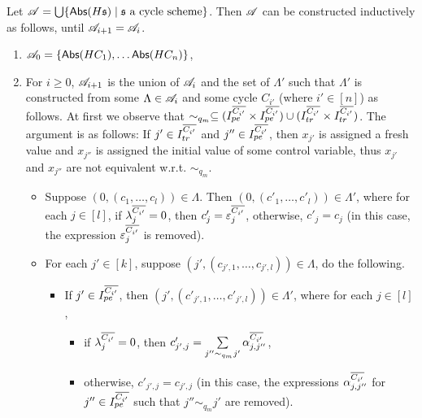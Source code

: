 Let $\mathscr{A}=\bigcup \{\mathsf{Abs}(H{\mathfrak{s} }) \mid {\mathfrak{s} } \mbox{ a cycle scheme}\}$. Then $\mathscr{A}$ can be constructed inductively as follows, until $\mathscr{A}_{i+1}= \mathscr{A}_i$. 
\begin{enumerate}
\item $\mathscr{A}_0 = \{\mathsf{Abs}(HC_1), \ldots \mathsf{Abs}(HC_n)\}$,

\item For $i \ge 0$, $\mathscr{A}_{i+1}$ is the union of $\mathscr{A}_i$ and the set of $\Lambda'$ such that $\Lambda'$ is constructed from some $\Lambda \in \mathscr{A}_i$ and some cycle $C_{i'}$ (where $ i' \in [n]$) as follows. At first we observe that $\sim_{q_m} \subseteq (I^{\overline{C_{i'}}}_{pe} \times I^{\overline{C_{i'}}}_{pe}) \cup (I^{\overline{C_{i'}}}_{tr} \times I^{\overline{C_{i'}}}_{tr})$. The argument is as follows: If $j' \in I^{\overline{C_{i'}}}_{tr}$ and $j'' \in I^{\overline{C_{i'}}}_{pe}$, then $x_{j'}$ is assigned a fresh value and $x_{j''}$ is assigned the initial value of some control variable, thus $x_{j'}$ and $x_{j''}$ are not equivalent w.r.t. $\sim_{q_m}$.
%
\begin{itemize}
\item Suppose $(0, (c_1, \dots, c_l)) \in \Lambda$. Then $(0, (c'_1, \dots, c'_l)) \in \Lambda'$, where for each $j \in [l]$, if $\lambda^{\overline{C_{i'}}}_j = 0$, then $c'_j = \varepsilon^{\overline{C_{i'}}}_{j}$, otherwise, $c'_j = c_j$ (in this case, the expression $\varepsilon^{\overline{C_{i'}}}_{j}$ is removed).  
%
\item For each $j' \in [k]$, suppose $(j', (c_{j',1}, \dots, c_{j',l})) \in \Lambda$, do the following. 
\begin{itemize}
\item If $j' \in I^{\overline{C_{i'}}}_{pe}$, then $(j', (c'_{j', 1}, \dots, c'_{j', l})) \in \Lambda'$,  where for each $j \in [l]$, 
\begin{itemize}
\item if $\lambda^{\overline{C_{i'}}}_j = 0$, then $c'_{j', j}= \sum \limits_{j'' \sim_{q_m} j'} \alpha^{\overline{C_{i'}}}_{j, j''}$, 
%
\item otherwise, $c'_{j', j} = c_{j',j} $ (in this case, the expressions $\alpha^{\overline{C_{i'}}}_{j,j''}$ for $j'' \in  I^{\overline{C_{i'}}}_{pe}$ such that $j'' \sim_{q_m} j'$ are removed).

\end{itemize}
\end{itemize}
\end{itemize}
\end{enumerate}
